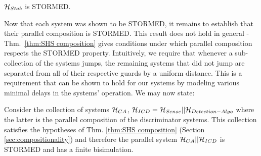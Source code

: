 \begin{lemma}
	\label{lemma:stability}
	$\mathcal{H}_{Stab}$ is STORMED.	
\end{lemma}

Now that each system was shown to be STORMED, it remains to establish that their parallel composition is STORMED.
This result does not hold in general - Thm.~\ref{thm:SHS composition} gives conditions under which parallel composition respects the STORMED property.
Intuitively, we require that whenever a sub-collection of the systems jumps, the remaining systems that did not jump are separated from all of their respective guards by a uniform distance.
This is a requirement that can be shown to hold for our systems by modeling various minimal delays in the systems' operation. 
We may now state:
\begin{thm}
Consider the collection of systems $\mathcal{H}_{CA}$, $\mathcal{H}_{ICD} = \mathcal{H}_{Sense} || \mathcal{H}_{Detection-Algo}$ where the latter is the parallel composition of the discriminator systems.
This collection satisfies the hypotheses of Thm. \ref{thm:SHS composition} (Section \ref{sec:compositionality}) and therefore the parallel system  $\mathcal{H}_{CA} || \mathcal{H}_{ICD}$ is STORMED and has a finite bisimulation.
\end{thm}